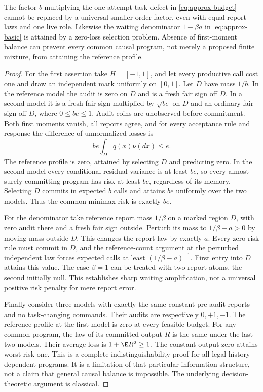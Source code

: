 \begin{proposition}\label{prop:sharp-approx}
The factor $b$ multiplying the one-attempt task defect in \eqref{eq:approx-budget} cannot be replaced by a universal smaller-order factor, even with equal report laws and one live role. Likewise the waiting denominator $1-\beta a$ in \eqref{eq:approx-basic} is attained by a zero-loss selection problem. Absence of first-moment balance can prevent every common causal program, not merely a proposed finite mixture, from attaining the reference profile.
\end{proposition}
\begin{proof}
For the first assertion take $H=[-1,1]$, and let every productive call cost one and draw an independent mark uniformly on $[0,1]$. Let $D$ have mass $1/b$. In the reference model the audit is zero on $D$ and is a fresh fair sign off $D$. In a second model it is a fresh fair sign multiplied by $\sqrt{be}$ on $D$ and an ordinary fair sign off $D$, where $0\le be\le1$. Audit coins are unobserved before commitment. Both first moments vanish, all reports agree, and for every acceptance rule and response the difference of unnormalized losses is
\[
 be\int_D q(x)\nu(dx)\le e.
\]
The reference profile is zero, attained by selecting $D$ and predicting zero. In the second model every conditional residual variance is at least $be$, so every almost-surely committing program has risk at least $be$, regardless of its memory. Selecting $D$ commits in expected $b$ calls and attains $be$ uniformly over the two models. Thus the common minimax risk is exactly $be$.

For the denominator take reference report mass $1/\beta$ on a marked region $D$, with zero audit there and a fresh fair sign outside. Perturb its mass to $1/\beta-a>0$ by moving mass outside $D$. This changes the report law by exactly $a$. Every zero-risk rule must commit in $D$, and the reference-count argument at the perturbed independent law forces expected calls at least $(1/\beta-a)^{-1}$. First entry into $D$ attains this value. The case $\beta=1$ can be treated with two report atoms, the second initially null. This establishes sharp waiting amplification, not a universal positive risk penalty for mere report error.

Finally consider three models with exactly the same constant pre-audit reports and no task-changing commands. Their audits are respectively $0,+1,-1$. The reference profile at the first model is zero at every feasible budget. For any common program, the law of its committed output $R$ is the same under the last two models. Their average loss is $1+\E R^2\ge1$. The constant output zero attains worst risk one. This is a complete indistinguishability proof for all legal history-dependent programs. It is a limitation of that particular information structure, not a claim that general causal balance is impossible. The underlying decision-theoretic argument is classical.
\end{proof}
